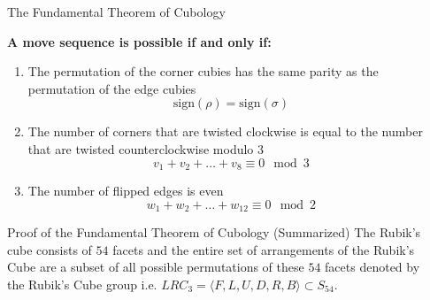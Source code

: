 \documentclass[final]{beamer}
\newlength{\sepwidth}
\newlength{\colwidth}
\newcommand{\separatorcolumn}{\begin{column}{\sepwidth}\end{column}}
\begin{document}
\begin{frame}[t]
\begin{columns}[t]
\separatorcolumn

\begin{column}{\colwidth}

  \begin{alertblock}{The Fundamental Theorem of Cubology}

    \textbf{A move sequence is possible if and only if:}

    \begin{enumerate}
      \item The permutation of the corner cubies has the same parity as the permutation of the edge cubies
      $$\text{sign}(\rho) = \text{sign}(\sigma)$$
      \item The number of corners that are twisted clockwise is equal to the number that are twisted counterclockwise modulo $3$
      $$v_{1} + v_{2} +\dots +v_{8} \equiv 0 \mod 3$$
      \item The number of flipped edges is even
      $$w_{1} + w_{2} +\dots +w_{12} \equiv 0 \mod 2$$
    \end{enumerate}


  \end{alertblock}

  \begin{block}{Proof of the Fundamental Theorem of Cubology (Summarized)}
    The Rubik's cube consists of $54$ facets and the entire set of arrangements of the Rubik's Cube are a subset of all possible permutations of these $54$ facets
    denoted by the Rubik's Cube group i.e. $LRC_{3} = \langle F,L,U,D,R,B\rangle \subset S_{54}$.

    \begin{figure}
      \centering
      \begin{multicols}{2}
        

\end{multicols}
\end{figure}
\end{block}
\end{column}
\end{columns}
\end{frame}
\end{document}
